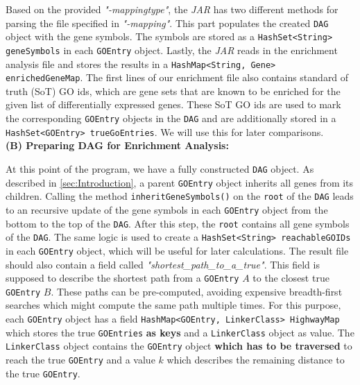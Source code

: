 \documentclass[12pt]{article}
\begin{document}
Based on the provided \textit{"-mappingtype"}, the \textit{JAR} has two different 
methods for parsing the file specified in \textit{"-mapping"}. 
This part populates the created \texttt{DAG} object with the gene symbols.
The symbols are stored as a \texttt{HashSet<String> geneSymbols} in each \texttt{GOEntry} object.
Lastly, the \textit{JAR} reads in the enrichment analysis file and stores the results
in a \texttt{HashMap<String, Gene> enrichedGeneMap}. The first lines of our enrichment file
also contains standard of truth (SoT) GO ids, which are gene sets that are known to be
enriched for the given list of differentially expressed genes. These SoT GO ids are 
used to mark the corresponding \texttt{GOEntry} objects in the \texttt{DAG} and are
additionally stored in a \texttt{HashSet<GOEntry> trueGoEntries}. We will use this
for later comparisons.\\
\hspace{1mm}
\hspace{1mm}
\textbf{(B) Preparing DAG for Enrichment Analysis:}

At this point of the program, we have a fully constructed \texttt{DAG} object.
As described in \ref{sec:Introduction}, a parent \texttt{GOEntry} object
inherits all genes from its children.
Calling the method \texttt{inheritGeneSymbols()} on the \texttt{root} of the \texttt{DAG}
leads to an recursive update of the gene symbols in each \texttt{GOEntry} object
from the bottom to the top of the \texttt{DAG}. After this step, the \texttt{root}
contains all gene symbols of the \texttt{DAG}. The same logic is used to 
create a \texttt{HashSet<String> reachableGOIDs} in each \texttt{GOEntry} object,
which will be useful for later calculations. The result file should also contain
a field called \textit{"shortest\_path\_to\_a\_true"}. This field is supposed to
describe the shortest path from a \texttt{GOEntry} $A$ to the closest true
\texttt{GOEntry} $B$. 
These paths can be pre-computed, avoiding expensive breadth-first searches which
might compute the same path multiple times.
For this purpose, each \texttt{GOEntry} object has a 
field \texttt{HashMap<GOEntry, LinkerClass> HighwayMap} which stores the
true \texttt{GOEntries} \textbf{as keys} and a \texttt{LinkerClass} object as value.
The \texttt{LinkerClass} object contains the \texttt{GOEntry} object
\textbf{which has to be traversed} to reach the true \texttt{GOEntry} and
a value $k$ which describes the remaining distance to the true \texttt{GOEntry}.
\end{document}
